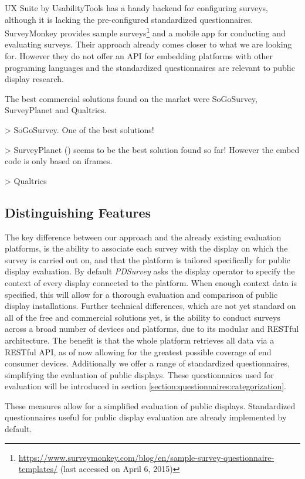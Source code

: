 	UX Suite by UsabilityTools has a handy backend for configuring surveys, although it is lacking the pre-configured standardized questionnaires. 
	SurveyMonkey provides sample surveys\footnote{\url{https://www.surveymonkey.com/blog/en/sample-survey-questionnaire-templates/} (last accessed on April 6, 2015)} and a mobile app for conducting and evaluating surveys. Their approach already comes closer to what we are looking for. However they do not offer an API for embedding platforms with other programing languages and the standardized questionnaires are relevant to public display research.

	The best commercial solutions found on the market were SoGoSurvey, SurveyPlanet and Qualtrics. 

		> SoGoSurvey. One of the best solutions!

		> SurveyPlanet () seems to be the best solution found so far! However the embed code is only based on iframes.

		> Qualtrics





	\subsection{Distinguishing Features}
	The key difference between our approach and the already existing evaluation platforms, is the ability to associate each survey with the display on which the survey is carried out on, and that the platform is tailored specifically for public display evaluation.
	By default \textit{PDSurvey} asks the display operator to specify the context of every display connected to the platform. When enough context data is specified, this will allow for a thorough evaluation and comparison of public display installations.
	Further technical differences, which are not yet standard on all of the free and commercial solutions yet, is the ability to conduct surveys across a broad number of devices and platforms, due to its modular and RESTful architecture. The benefit is that the whole platform retrieves all data via a RESTful API, as of now allowing for the greatest possible coverage of end consumer devices. Additionally we offer a range of standardized questionnaires, simplifying the evaluation of public displays. These questionnaires used for evaluation will be introduced in section \ref{section:questionnaires:categorization}.

	These measures allow for a simplified evaluation of public displays. Standardized questionnaires useful for public display evaluation are already implemented by default.

